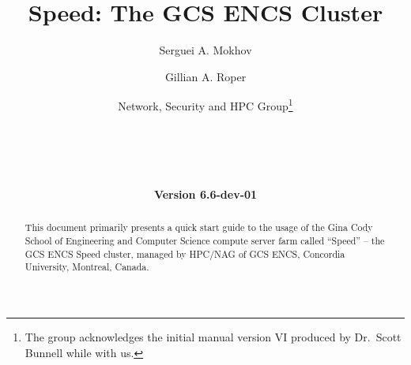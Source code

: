 \documentclass{easychair}
\begin{document}
%
\title{Speed: The GCS ENCS Cluster}

%

\date{\textbf{Version 6.6-dev-01}}

%
\author{
    Serguei A. Mokhov
\and
    Gillian A. Roper
\and
    Network, Security and HPC Group\footnote{The group acknowledges the initial manual version VI produced by Dr.~Scott Bunnell while with us.}\\
    \\
    \\
    \\
    \\
}

%

\maketitle

\begin{abstract}
This document primarily presents a quick start
guide to the usage of the Gina Cody School of
Engineering and Computer Science compute server farm
called ``Speed'' -- the GCS ENCS Speed cluster,
managed by HPC/NAG of GCS ENCS, Concordia University,
Montreal, Canada.
\end{abstract}

\tableofcontents
\clearpage
\end{document}
